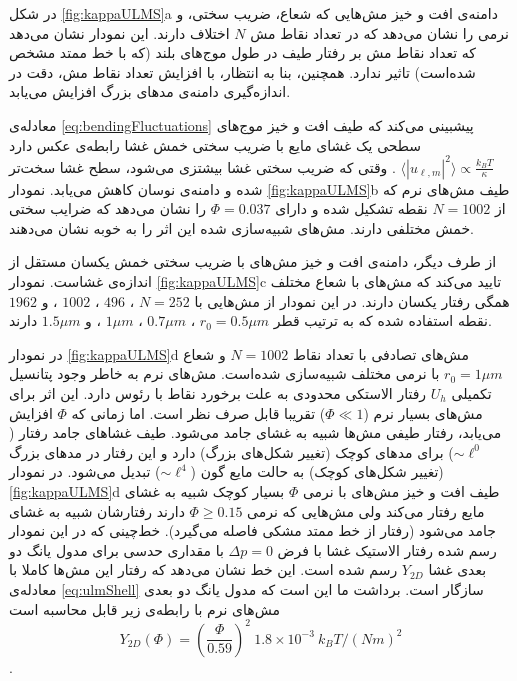 در شکل
\ref{fig:kappaULMS}a
دامنه‌ی افت و خیز مش‌هایی که شعاع، ضریب سختی، و نرمی را نشان می‌دهد که در تعداد نقاط مش
$N$
اختلاف دارند. این نمودار نشان می‌دهد که تعداد نقاط مش بر رفتار طیف در طول موج‌های بلند (که با خط ممتد مشخص شده‌است) تاثیر ندارد. همچنین، بنا به انتظار، با افزایش تعداد نقاط مش، دقت در اندازه‌گیری دامنه‌ی مد‌های بزرگ افزایش می‌یابد.

معادله‌ی 
\ref{eq:bendingFluctuations}
پیشبینی می‌کند که طیف افت و خیز موج‌های سطحی یک غشای مایع با ضریب سختی خمش غشا رابطه‌ی عکس دارد
$\langle|u_{\ell,m}|^2\rangle\propto \frac{k_BT}{\kappa}$
. وقتی که ضریب سختی غشا بیشتزی می‌شود، سطح غشا سخت‌تر شده و دامنه‌ی نوسان کاهش می‌یابد.  نمودار
\ref{fig:kappaULMS}b
 طیف مش‌های نرم که از 
$N=1002$ 
نقطه تشکیل شده و دارای
$\Phi=0.037$ 
را نشان می‌دهد که ضرایب سختی خمش مختلفی دارند. مش‌های شبیه‌سازی شده این اثر را به خوبه نشان می‌دهند. 

از طرف دیگر، دامنه‌ی افت و خیز مش‌های با ضریب سختی خمش یکسان مستقل از اندازه‌ی غشاست. نمودار 
\ref{fig:kappaULMS}c
تایید می‌کند که مش‌های با شعاع مختلف همگی رفتار یکسان دارند. در این نمودار از مش‌هایی با 
$N=252$
،
$496$
،
$1002$
، و
$1962$
نقطه استفاده شده که به ترتیب قطر
 $r_0=0.5\mu m$
،
$0.7\mu m$
،
$1\mu m$
، و 
$1.5 \mu m$
دارند.


در نمودار
\ref{fig:kappaULMS}d
مش‌های تصادفی با تعداد نقاط
$N=1002$
و شعاع
$r_0=1 \mu m$
با نرمی مختلف شبیه‌سازی شده‌است. مش‌های نرم به خاطر وجود پتانسیل تکمیلی
$U_h$
رفتار الاستکی محدودی به علت برخورد نقاط با رئوس دارد. این اثر برای مش‌های بسیار نرم
 ($\Phi\ll1$)
تقریبا قابل صرف نظر است. اما زمانی که 
$\Phi$
افزایش می‌یابد، رفتار طیفی‌ مش‌ها شبیه به غشای جامد می‌شود. طیف غشاهای جامد رفتار
($\sim\ell^0$)
برای مدهای کوچک (تغییر شکل‌های بزرگ) دارد و این رفتار در مد‌های بزرگ (تغییر شکل‌های کوچک) به حالت مایع گون
($\sim\ell^4$)
تبدیل می‌شود. در نمودار
\ref{fig:kappaULMS}d
طیف افت و خیز مش‌های با نرمی 
$\Phi$
بسیار کوچک شبیه به غشای مایع رفتار می‌کند ولی مش‌هایی که نرمی 
$\Phi\geq0.15$
دارند رفتارشان شبیه به غشای جامد می‌شود (رفتار از خط ممتد مشکی فاصله می‌گیرد). خط‌چینی که در این نمودار رسم شده رفتار الاستیک غشا با فرض 
$\Delta p=0$
با مقداری حدسی برای مدول یانگ دو بعدی غشا
$Y_{2D}$
رسم شده است. این خط نشان می‌دهد که رفتار این مش‌ها کاملا با معادله‌ی
\ref{eq:ulmShell}
سازگار است. برداشت ما این است که مدول یانگ دو بعدی مش‌‌های نرم با رابطه‌ی زیر قابل محاسبه است
\begin{equation}
Y_{2D}(\Phi)= \left(\frac{\Phi}{0.59}\right)^2~1.8\times 10^{-3}~k_BT/(Nm)^2
\label{eq:YoungPhi}
\end{equation}
.

